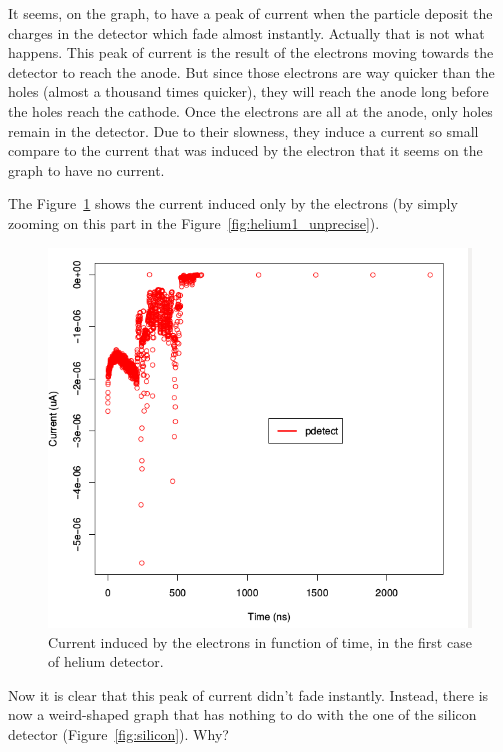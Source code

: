 \documentclass[11pt]{article}
\begin{document}
			It seems, on the graph, to have a peak of current when the particle deposit the charges in the
			detector which fade almost instantly. Actually that is not what happens. This peak of current
			is the result of the electrons moving towards the detector to reach the anode. But since those
			electrons are way quicker than the holes (almost a thousand times quicker), they will reach the
			anode long before the holes reach the cathode. Once the electrons are all at the anode, only holes
			remain in the detector. Due to their slowness, they induce a current so small compare to the
			current that was induced by the electron that it seems on the graph to have no current.

			The Figure~\ref{fig:helium1_precise} shows the current induced only by the electrons (by simply zooming
			on this part in the Figure~\ref{fig:helium1_unprecise}).

			\begin{figure}[H]
			  \center
			  \includegraphics[scale=0.5]{images/applications/helium1_precise.png}
			  \caption{Current induced by the electrons in function of time, in the first case of helium detector.}
			  \label{fig:helium1_precise}
			\end{figure}

			Now it is clear that this peak of current didn't fade instantly. Instead, there is now a weird-shaped
			graph that has nothing to do with the one of the silicon detector (Figure~\ref{fig:silicon}). Why?
\end{document}
